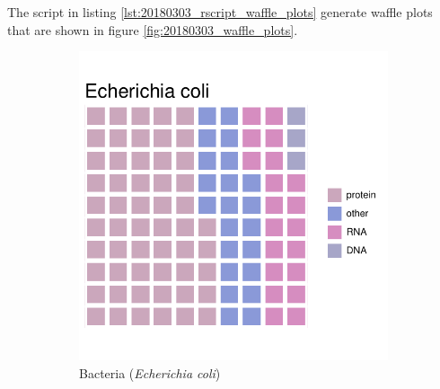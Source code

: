 The script in listing \ref{lst:20180303_rscript_waffle_plots} generate waffle plots that are shown in figure \ref{fig:20180303_waffle_plots}.

\begin{figure}[H] %
    \centering
    \caption{Representation of the taxonomic differences of the median macromolecular composition as percent dry weight under nutrient-sufficient exponential growth conditions.}
    \label{fig:20180303_waffle_plots}
    \begin{subfigure}[b]{0.3\textwidth}
        \includegraphics[width=\textwidth]{graphics/plots/20180303_waffle_ecoli.pdf}
        \caption{Bacteria (\textit{Echerichia coli})}
        \label{sfig:slabel1}
    \end{subfigure}
    ~ 
    \begin{subfigure}[b]{0.3\textwidth}

\end{subfigure}
\end{figure}
